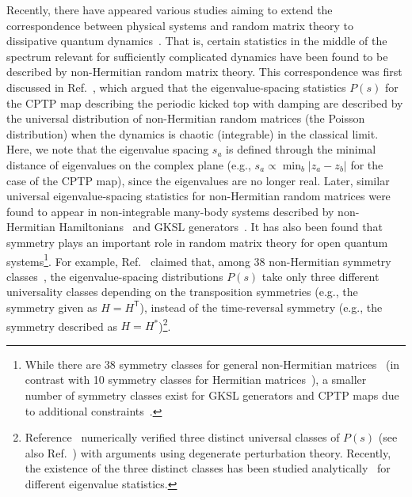 \documentclass[preprint,pteplogo]{ptephy_v2}%
\numberwithin{equation}{section}
\theoremstyle{definition}
\begin{document}
Recently, there have appeared various studies aiming to extend the correspondence between physical systems and random matrix theory to dissipative quantum dynamics~\cite{jaiswal2019universality, hamazaki2019non, akemann2019universal, hamazaki2020universality, sa2020complex, huang2020anderson, tzortzakakis2020non, mudute2020non, luo2021universality, sa2021integrable, rubio2022integrability, prasad2022dissipative, garcia2022symmetry, ghosh2022spectral, ray2024ergodic, gupta2024quantum, akemann2025two, pawar2025comparative}.
That is, certain statistics in the middle of the spectrum relevant for sufficiently complicated dynamics have been found to be described by non-Hermitian random matrix theory.
This correspondence was first discussed in Ref.~\cite{grobe1988quantum}, which argued that the eigenvalue-spacing statistics $P(s)$ for the CPTP map describing the periodic kicked top with damping are described by the universal distribution of non-Hermitian random matrices (the Poisson distribution) when the dynamics is chaotic (integrable) in the classical limit.
Here, we note that the eigenvalue spacing $s_a$ is defined through the minimal distance of eigenvalues on the complex plane (e.g., $s_a\propto\min_{b}|z_a-z_b|$ for the case of the CPTP map), since the eigenvalues are no longer real.
Later, similar universal eigenvalue-spacing statistics for non-Hermitian random matrices were found to appear in non-integrable many-body systems described by non-Hermitian Hamiltonians~\cite{markum1999non, hamazaki2019non} and GKSL generators~\cite{akemann2019universal}.
It has also been found that symmetry plays an important role in random matrix theory for open quantum systems\footnote{
While there are 38 symmetry classes for general non-Hermitian matrices~\cite{kawabata2019symmetry} (in contrast with 10 symmetry classes for Hermitian matrices~\cite{altland1997nonstandard}), a smaller number of symmetry classes exist for GKSL generators and CPTP maps due to additional constraints~\cite{lieu2020tenfold, sa2023symmetry, kawabata2023symmetry, nakagawa2025topology}.
}.
For example, Ref.~\cite{hamazaki2020universality} claimed that, among 38 non-Hermitian symmetry classes~\cite{kawabata2019symmetry}, the eigenvalue-spacing distributions $P(s)$ take only three different universality classes depending on the transposition symmetries (e.g., the symmetry given as $H=H^\mathsf{T}$), instead of the time-reversal symmetry (e.g., the symmetry described as $H=H^*$)\footnote{
Reference~\cite{hamazaki2020universality} numerically verified three distinct universal classes of $P(s)$ (see also Ref.~\cite{jaiswal2019universality}) with arguments using degenerate perturbation theory. 
Recently, the existence of the three distinct classes has been studied analytically~\cite{akemann2025complex, kulkarni2025non, forrester2025dualities} for different eigenvalue statistics.
}.
\end{document}

